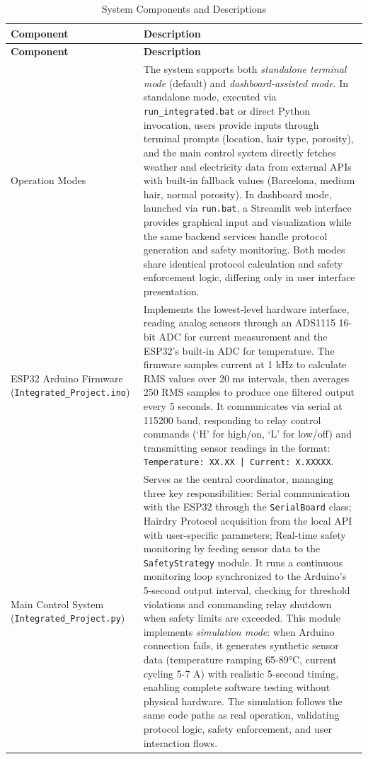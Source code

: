 \documentclass[11pt,a4paper]{article}
\begin{document}
\begin{longtable}{|p{}|p{}|}
\caption{System Components and Descriptions}
\label{tab:system_components} \\
\hline
\textbf{Component} & \textbf{Description} \\
\hline
\endfirsthead
\hline
\textbf{Component} & \textbf{Description} \\
\hline
\endhead
\hline
\endfoot
\hline
\endlastfoot
Operation Modes & The system supports both \emph{standalone terminal mode} (default) and \emph{dashboard-assisted mode}. In standalone mode, executed via \texttt{run\_integrated.bat} or direct Python invocation, users provide inputs through terminal prompts (location, hair type, porosity), and the main control system directly fetches weather and electricity data from external APIs with built-in fallback values (Barcelona, medium hair, normal porosity). In dashboard mode, launched via \texttt{run.bat}, a Streamlit web interface provides graphical input and visualization while the same backend services handle protocol generation and safety monitoring. Both modes share identical protocol calculation and safety enforcement logic, differing only in user interface presentation. \\
\hline
ESP32 Arduino Firmware (\texttt{Integrated\_Project.ino}) & Implements the lowest-level hardware interface, reading analog sensors through an ADS1115 16-bit ADC for current measurement and the ESP32's built-in ADC for temperature. The firmware samples current at 1 kHz to calculate RMS values over 20 ms intervals, then averages 250 RMS samples to produce one filtered output every 5 seconds. It communicates via serial at 115200 baud, responding to relay control commands (`H' for high/on, `L' for low/off) and transmitting sensor readings in the format: \texttt{Temperature: XX.XX | Current: X.XXXXX}. \\
\hline
Main Control System (\texttt{Integrated\_Project.py}) & Serves as the central coordinator, managing three key responsibilities: Serial communication with the ESP32 through the \texttt{SerialBoard} class; Hairdry Protocol acquisition from the local API with user-specific parameters; Real-time safety monitoring by feeding sensor data to the \texttt{SafetyStrategy} module. It runs a continuous monitoring loop synchronized to the Arduino's 5-second output interval, checking for threshold violations and commanding relay shutdown when safety limits are exceeded. This module implements \emph{simulation mode}: when Arduino connection fails, it generates synthetic sensor data (temperature ramping 65-89°C, current cycling 5-7 A) with realistic 5-second timing, enabling complete software testing without physical hardware. The simulation follows the same code paths as real operation, validating protocol logic, safety enforcement, and user interaction flows. \\

\end{longtable}
\end{document}
